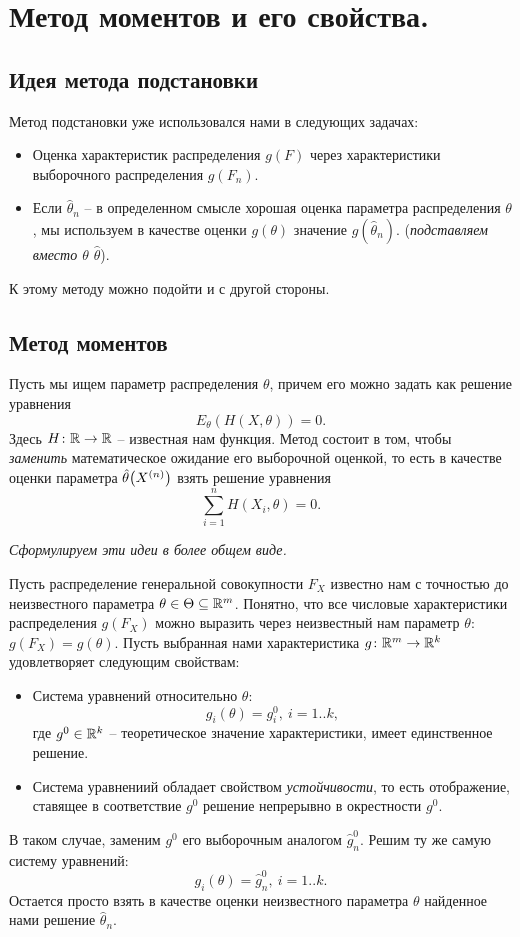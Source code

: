 \section{Метод моментов и его свойства.}

\subsection{Идея метода подстановки}
Метод подстановки уже использовался нами в следующих задачах:
\begin{itemize}
    \item Оценка характеристик распределения $g(F)$ через характеристики
        выборочного распределения $g(F_n)$.
    \item Если $\hat{\theta}_n$ -- в определенном смысле хорошая оценка
        параметра распределения $\theta$, мы используем в качестве оценки
        $g(\theta)$ значение $g(\hat{\theta}_n)$. (\textit{подставляем
        вместо $\theta$ $\hat{\theta}$}).
\end{itemize}

К этому методу можно подойти и с другой стороны.

\subsection{Метод моментов}
Пусть мы ищем параметр распределения $\theta$, причем его можно задать как
решение уравнения
\[
    E_\theta(H(X, \theta)) = 0
.\]
Здесь $H \colon \mathbb{R} \to \mathbb{R}$ -- известная нам функция. Метод состоит в том,
чтобы \textit{заменить} математическое ожидание его выборочной оценкой,
то есть в качестве оценки параметра $\hat{\theta}\parens*{X^{(n)}}$ взять
решение уравнения
\[
    \sum_{i = 1}^n{H(X_i, \theta)} = 0
.\]

\textit{Сформулируем эти идеи в более общем виде.}

Пусть распределение генеральной совокупности $F_X$ известно нам с точностью до
неизвестного параметра $\theta \in \Theta \subseteq \mathbb{R}^m$. Понятно, что все числовые
характеристики распределения $g(F_X)$ можно выразить через неизвестный нам
параметр $\theta$: $g(F_X) = g(\theta)$. Пусть выбранная нами характеристика
$g \colon \mathbb{R}^m \to \mathbb{R}^k$ удовлетворяет следующим свойствам:
\begin{itemize}
    \item Система уравнений относительно $\theta$:
        \[
            g_i(\theta) = g^0_i,~ i = 1..k
        ,\]
        где $g^0 \in \mathbb{R}^k$ -- теоретическое значение характеристики,
        имеет единственное решение.
    \item Система уравнениий обладает свойством \textit{устойчивости}, то есть
        отображение, ставящее в соответствие $g^0$ решение непрерывно в
        окрестности $g^0$.
\end{itemize}
В таком случае, заменим $g^0$ его выборочным аналогом $\hat{g}^0_n$. Решим
ту же самую систему уравнений:
\[
    g_i(\theta) = \hat{g}^0_n,~ i = 1..k
.\]
Остается просто взять в качестве оценки неизвестного параметра $\theta$
найденное нами решение $\hat{\theta}_n$.

